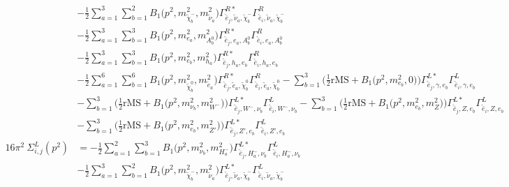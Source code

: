 \begin{itemize}
\begin{align}
 &-\frac{1}{2} \sum_{a=1}^{3}\sum_{b=1}^{2}{B_1\Big(p^{2},m^2_{\tilde{\chi}^-_{{b}}},m^2_{\tilde{\nu}_{{a}}}\Big)} {\Gamma^{R*}_{\check{\bar{e}}_{{j}},\tilde{\nu}_{{a}},\tilde{\chi}^-_{{b}}}} {\Gamma^R_{\check{\bar{e}}_{{i}},\tilde{\nu}_{{a}},\tilde{\chi}^-_{{b}}}}  \nonumber \\ 
 &-\frac{1}{2} \sum_{a=1}^{3}\sum_{b=1}^{3}{B_1\Big(p^{2},m^2_{e_{{a}}},m^2_{A^0_{{b}}}\Big)} {\Gamma^{R*}_{\check{\bar{e}}_{{j}},e_{{a}},A^0_{{b}}}} {\Gamma^R_{\check{\bar{e}}_{{i}},e_{{a}},A^0_{{b}}}}  \nonumber \\ 
 &-\frac{1}{2} \sum_{a=1}^{3}\sum_{b=1}^{3}{B_1\Big(p^{2},m^2_{e_{{b}}},m^2_{h_{{a}}}\Big)} {\Gamma^{R*}_{\check{\bar{e}}_{{j}},h_{{a}},e_{{b}}}} {\Gamma^R_{\check{\bar{e}}_{{i}},h_{{a}},e_{{b}}}}  \nonumber \\ 
 &-\frac{1}{2} \sum_{a=1}^{6}\sum_{b=1}^{6}{B_1\Big(p^{2},m^2_{\tilde{\chi}^0_{{b}}},m^2_{\tilde{e}_{{a}}}\Big)} {\Gamma^{R*}_{\check{\bar{e}}_{{j}},\tilde{e}_{{a}},\tilde{\chi}^0_{{b}}}} {\Gamma^R_{\check{\bar{e}}_{{i}},\tilde{e}_{{a}},\tilde{\chi}^0_{{b}}}}  - \sum_{b=1}^{3}\Big(\frac{1}{2} \text{rMS}  + {B_1\Big(p^{2},m^2_{e_{{b}}},0\Big)}\Big){\Gamma^{L*}_{\check{\bar{e}}_{{j}},\gamma,e_{{b}}}} {\Gamma^L_{\check{\bar{e}}_{{i}},\gamma,e_{{b}}}}  \nonumber \\ 
 &- \sum_{b=1}^{3}\Big(\frac{1}{2} \text{rMS}  + {B_1\Big(p^{2},m^2_{\nu_{{b}}},m^2_{W^-}\Big)}\Big){\Gamma^{L*}_{\check{\bar{e}}_{{j}},W^-,\nu_{{b}}}} {\Gamma^L_{\check{\bar{e}}_{{i}},W^-,\nu_{{b}}}}  - \sum_{b=1}^{3}\Big(\frac{1}{2} \text{rMS}  + {B_1\Big(p^{2},m^2_{e_{{b}}},m^2_{Z}\Big)}\Big){\Gamma^{L*}_{\check{\bar{e}}_{{j}},Z,e_{{b}}}} {\Gamma^L_{\check{\bar{e}}_{{i}},Z,e_{{b}}}}  \nonumber \\ 
 &- \sum_{b=1}^{3}\Big(\frac{1}{2} \text{rMS}  + {B_1\Big(p^{2},m^2_{e_{{b}}},m^2_{{Z'}}\Big)}\Big){\Gamma^{L*}_{\check{\bar{e}}_{{j}},{Z'},e_{{b}}}} {\Gamma^L_{\check{\bar{e}}_{{i}},{Z'},e_{{b}}}}  \\ 
16\pi^2 \ \Sigma^L_{i,j}(p^2) &= -\frac{1}{2} \sum_{a=1}^{2}\sum_{b=1}^{3}{B_1\Big(p^{2},m^2_{\nu_{{b}}},m^2_{H^-_{{a}}}\Big)} {\Gamma^{L*}_{\check{\bar{e}}_{{j}},H^-_{{a}},\nu_{{b}}}} {\Gamma^L_{\check{\bar{e}}_{{i}},H^-_{{a}},\nu_{{b}}}}  \nonumber \\ 
 &-\frac{1}{2} \sum_{a=1}^{3}\sum_{b=1}^{2}{B_1\Big(p^{2},m^2_{\tilde{\chi}^-_{{b}}},m^2_{\tilde{\nu}_{{a}}}\Big)} {\Gamma^{L*}_{\check{\bar{e}}_{{j}},\tilde{\nu}_{{a}},\tilde{\chi}^-_{{b}}}} {\Gamma^L_{\check{\bar{e}}_{{i}},\tilde{\nu}_{{a}},\tilde{\chi}^-_{{b}}}}  \nonumber \\ 

\end{align}
\end{itemize}
